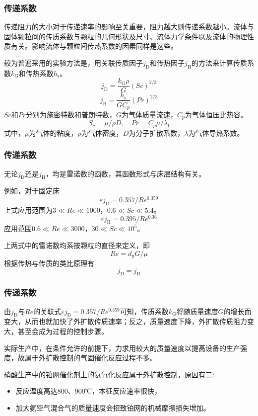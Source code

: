 \documentclass[dvipsnames, svgnames, x11names]{beamer}
\begin{document}
\begin{frame}
    \frametitle{传递系数}

    传递阻力的大小对于传递速率的影响至关重要，阻力越大则传递系数越小。流体与固体颗粒间的传质系数与颗粒的几何形状及尺寸、流体力学条件以及流体的物理性质有关。影响流体与颗粒间传热系数的因素同样是这些。
    
    较为普遍采用的实验方法是，用关联传质因子$j_{\mathrm{D}}$和传热因子$j_{\mathrm{H}}$的方法来计算传质系数$k_{\mathrm{G}}$和传热系数$h_{\mathrm{s}}$。
    \[
        j_{\mathrm{D}}=\frac{k_{\mathrm{G}} \rho}{G}(S c)^{2 / 3}
    \]
    \[
        j_{\mathrm{H}}=\frac{h_{\mathrm{s}}}{G C_{p}}(P r)^{2 / 3}
    \]
    $Sc$和$Pr$分别为施密特数和普朗特数，$G$为气体质量流速，$C_{p}$为气体恒压比热容。
    \[
        S_{c}=\mu / \rho D, \quad P r=C_{p} \mu / \lambda_{\mathrm{f}}
    \]
    式中，$\mu$为气体的粘度，$\rho$为气体密度，$D$为分子扩散系数，$\lambda$为气体导热系数。

\end{frame}


\begin{frame}
    \frametitle{传递系数}

    无论$j_\mathrm{D}$还是$j_\mathrm{H}$，均是雷诺数的函数，其函数形式与床层结构有关。
    
    例如，对于固定床
    \[
        \varepsilon j_{\mathrm{D}}=0.357 / R e^{0.359}
    \]
    上式应用范围为$3 \ll Re \ll 1000$，$0.6 \ll Sc \ll 5.4$。
    \[
        \varepsilon j_{\mathrm{H}}=0.395 / R e^{0.36}
    \]
    应用范围$0.6 \ll Re \ll 3000$，$30 \ll Sc \ll 10^5$。

    上两式中的雷诺数均系按颗粒的直径来定义，即
    \[
        R e=d_{\mathrm{p}} G / \mu
    \]
    根据传热与传质的类比原理有
    \[
        j_{\mathrm{D}}=j_{\mathrm{H}}
    \]

\end{frame}


\begin{frame}
    \frametitle{传递系数}

    由$j_{\mathrm{D}}$与$Re$的关联式$\varepsilon j_{\mathrm{D}}=0.357 / R e^{0.359}$可知，传质系数$k_\mathrm{G}$将随质量速度$G$的增长而变大，从而也就加快了外扩散传质速率；反之，质量速度下降，外扩散传质阻力变大，甚至会成为过程的控制步骤。

    实际生产中，在条件允许的前提下，力求用较大的质量速度以提高设备的生产强度，故属于外扩散控制的气固催化反应过程不多。
    
    硝酸生产中的铂网催化剂上的氨氧化反应属于外扩散控制，原因有二:
    \begin{itemize}
        \item 反应温度高达800、900℃，本征反应速率很快，
        \item 加大氨空气混合气的质量速度会招致铂网的机械摩擦损失增加。
    \end{itemize}

\end{frame}
\end{document}
